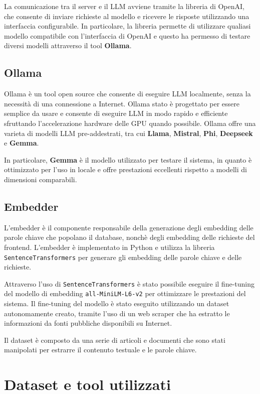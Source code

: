 La comunicazione tra il server e il LLM avviene tramite la
libreria di OpenAI, che consente di inviare richieste al
modello e ricevere le risposte utilizzando una interfaccia
configurabile.
In particolare, la libreria permette di utilizzare qualiasi
modello compatibile con l'interfaccia di OpenAI e questo ha
permesso di testare diversi modelli attraverso il tool
\textbf{Ollama}.

\subsection{Ollama}
\label{sec:ollama}
Ollama è un tool open source che consente di eseguire LLM
localmente, senza la necessità di una connessione a
Internet.
Ollama stato è progettato per essere semplice da usare e
consente di eseguire LLM in modo rapido e efficiente
sfruttando l'accelerazione hardware delle GPU quando
possibile.
Ollama offre una varieta di modelli LLM pre-addestrati, tra
cui \textbf{Llama}, \textbf{Mistral}, \textbf{Phi},
\textbf{Deepseek} e \textbf{Gemma}.

In particolare, \textbf{Gemma} è il modello utilizzato per
testare il sistema, in quanto è ottimizzato per l'uso in
locale e offre prestazioni eccellenti rispetto a modelli di
dimensioni comparabili\cite{gemma_2025}.

\subsection{Embedder}
\label{sec:embedder}
L'embedder è il componente responsabile della generazione
degli embedding delle parole chiave che popolano il
database, nonchè degli embedding delle richieste del
frontend.
L'embedder è implementato in Python e utilizza la libreria
\texttt{SentenceTransformers}\cite{reimers-2019-sentence-bert}
per generare gli embedding delle parole chiave e delle
richieste.

Attraverso l'uso di \texttt{SentenceTransformers} è stato
possibile eseguire il fine-tuning del modello di embedding
\texttt{all-MiniLM-L6-v2} per ottimizzare le prestazioni
del sistema.
Il fine-tuning del modello è stato eseguito utilizzando un
dataset autonomamente creato, tramite l'uso di un web
scraper che ha estratto le informazioni da fonti pubbliche
disponibili su Internet.

Il dataset è composto da una serie di articoli e documenti
che sono stati manipolati per estrarre il contenuto
testuale e le parole chiave.

\section{Dataset e tool utilizzati}
\label{sec:dataset}

